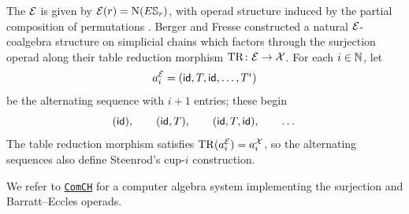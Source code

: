 The  $\mathcal{E}$ is given by $\mathcal{E}(r) = \operatorname{N}(E\mathbb{S}_r)$, with operad structure induced by the partial composition of permutations \cite{berger2004combinatorial}.
Berger and Fresse constructed a natural $\mathcal{E}$-coalgebra structure on simplicial chains which factors through the surjection operad along their table reduction morphism $\operatorname{TR} \colon \mathcal{E} \to \mathcal{X}$.
For each $i \in \mathbb{N}$, let
\[
a_i^{\mathcal{E}} = (\mathsf{id}, T, \mathsf{id}, \dots, T^i)
\]
be the alternating sequence with $i+1$ entries; these begin
\[
(\mathsf{id}), \qquad (\mathsf{id}, T), \qquad (\mathsf{id}, T, \mathsf{id}), \qquad \dots
\]
The table reduction morphism satisfies $\operatorname{TR}(a_i^{\mathcal{E}}) = a_i^{\mathcal{X}}$, so the alternating sequences also define Steenrod's \mbox{cup-$i$} construction.

We refer to \href{https://comch.readthedocs.io/en/latest/}{\texttt{ComCH}} for a computer algebra system implementing the surjection and Barratt--Eccles operads.

%
%
%
